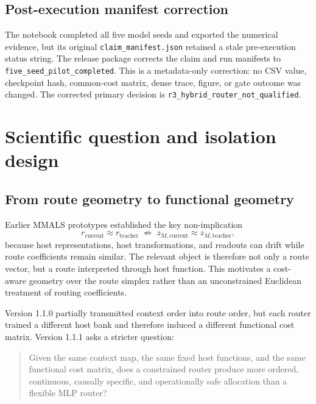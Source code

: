 \documentclass[11pt,a4paper]{article}
\begin{document}
\subsection{Post-execution manifest correction}
The notebook completed all five model seeds and exported the numerical evidence,
but its original \texttt{claim\_manifest.json} retained a stale pre-execution
status string. The release package corrects the claim and run manifests to
\texttt{five\_seed\_pilot\_completed}. This is a metadata-only correction:
no CSV value, checkpoint hash, common-cost matrix, dense trace, figure, or gate
outcome was changed. The corrected primary decision is
\texttt{r3\_hybrid\_router\_not\_qualified}.

\section{Scientific question and isolation design}
\subsection{From route geometry to functional geometry}
Earlier MMALS prototypes established the key non-implication
\begin{equation}
 r_{\mathrm{current}}\approx r_{\mathrm{teacher}}
 \;\not\Rightarrow\;
 z_{M,\mathrm{current}}\approx z_{M,\mathrm{teacher}},
\end{equation}
because host representations, host transformations, and readouts can drift while route coefficients remain similar. The relevant object is therefore not only a route vector, but a route interpreted through host function. This motivates a cost-aware geometry over the route simplex rather than an unconstrained Euclidean treatment of routing coefficients.

Version 1.1.0 partially transmitted context order into route order, but each router trained a different host bank and therefore induced a different functional cost matrix. Version 1.1.1 asks a stricter question:
\begin{quote}
Given the same context map, the same fixed host functions, and the same functional cost matrix, does a constrained router produce more ordered, continuous, causally specific, and operationally safe allocation than a flexible MLP router?
\end{quote}
\end{document}
